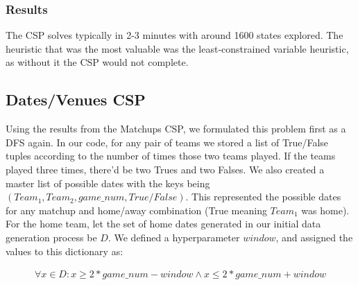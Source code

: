 \documentclass{article}
\begin{document}
	\subsubsection{Results}
	The CSP solves typically in 2-3 minutes with around 1600 states explored. The heuristic that was the most valuable was the least-constrained variable heuristic, as without it the CSP would not complete.

	\subsection{Dates/Venues CSP}
	Using the results from the Matchups CSP, we formulated this problem first as a DFS again. In our code, for any pair of teams we stored a list of True/False tuples according to the number of times those two teams played. If the teams played three times, there'd be two Trues and two Falses. We also created a master list of possible dates with the keys being $(Team_1,Team_2,game\_num,True/False)$. This represented the possible dates for any matchup and home/away combination (True meaning $Team_1$ was home). For the home team, let the set of home dates generated in our initial data generation process be $D$. We defined a hyperparameter $window$, and assigned the values to this dictionary as:

	\begin{eqnarray*}
		\forall x \in D: x \geq 2*game\_num - window \land x \leq 2*game\_num + window
	\end{eqnarray*}
\end{document}
